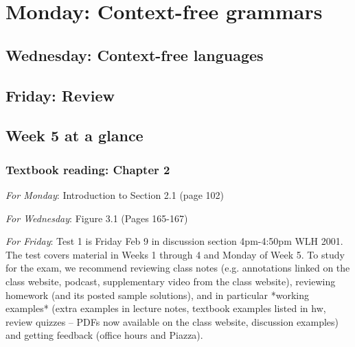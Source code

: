 \newpage

\section*{Monday: Context-free grammars}


    
\newpage
\subsection*{Wednesday: Context-free languages}




\newpage
\subsection*{Friday: Review}



\newpage

\subsection*{Week 5 at a glance}

\subsubsection*{Textbook reading: Chapter 2}

{\it For Monday}: Introduction to Section 2.1 (page 102)

{\it For Wednesday}: Figure 3.1 (Pages 165-167)

{\it For Friday}: Test 1 is Friday Feb 9 in discussion section 4pm-4:50pm WLH 2001.  
The test covers material in Weeks 1 through 4 and Monday of Week 5.  To study for the exam, 
we recommend reviewing class notes (e.g. annotations linked on the class website, podcast, 
supplementary video from the class website), reviewing homework (and its posted sample solutions), 
and in particular *working examples* (extra examples in lecture notes, textbook examples listed in hw, 
review quizzes -- PDFs now available on the class website, discussion examples) and getting feedback (office hours and Piazza). 



